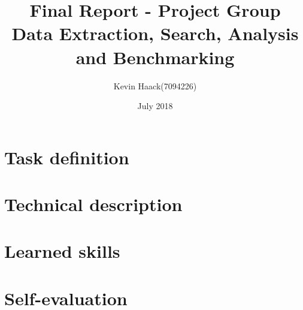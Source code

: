 \documentclass{llncs}
\title{Final Report - Project Group\\Data Extraction, Search, Analysis and Benchmarking}
\author{Kevin Haack(7094226)}
\institute{Paderborn University\\
\email{khaack@mail.uni-paderborn.de}}
\date{July 2018}
\begin{document}
\maketitle
\clearpage

\section{Task definition}

\clearpage

\section{Technical description}

\clearpage

\section{Learned skills}


\section{Self-evaluation}

\end{document}
